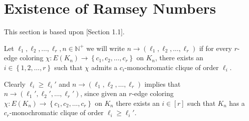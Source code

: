 \section{Existence of Ramsey Numbers}
This section is based upon \cite{rt}[Section 1.1].
\begin{definition}
	Let $\ell_1, \ell_2, \ldots, \ell_r, n \in \mathbb{N}^{+}$ we will write $n \to (\ell_1, \ell_2, \ldots, \ell_{r})$ if for every $r$-edge coloring $\chi: E(K_{n}) \to \left\{c_1, c_2, \ldots, c_{r}\right\}$ on $K_n$, there exists an $i \in \left\{1, 2, \ldots, r\right\}$ such that $\chi$ admits a $c_{i}$-monochromatic clique of order $\ell_{i}$.
\end{definition}
\begin{remark}
	Clearly $\ell_i \geq \ell_i'$ and $n \to (\ell_1, \ell_2, \ldots, \ell_{r})$ implies that $n \to (\ell_1', \ell_2', \ldots, \ell_{r}')$, since given an $r$-edge coloring $\chi: E(K_{n}) \to \left\{c_1, c_2, \ldots, c_{r}\right\}$ on $K_{n}$ there exists an $i \in [r]$ such that $K_n$ has a $c_{r}$-monochromatic clique of order $\ell_{i} \geq \ell_{i}'$.
\end{remark}

